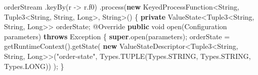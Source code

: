\documentclass[cn,11pt,chinese]{elegantbook}
\newenvironment{Shaded}{}{}
\newcommand{\AttributeTok}[1]{\textcolor[rgb]{0.49,0.56,0.16}{#1}}
\newcommand{\BuiltInTok}[1]{#1}
\newcommand{\DataTypeTok}[1]{\textcolor[rgb]{0.56,0.13,0.00}{#1}}
\newcommand{\FunctionTok}[1]{\textcolor[rgb]{0.02,0.16,0.49}{#1}}
\newcommand{\KeywordTok}[1]{\textcolor[rgb]{0.00,0.44,0.13}{\textbf{#1}}}
\newcommand{\NormalTok}[1]{#1}
\newcommand{\StringTok}[1]{\textcolor[rgb]{0.25,0.44,0.63}{#1}}
\begin{document}
\begin{Shaded}
\begin{Highlighting}[]
\NormalTok{        orderStream}
\NormalTok{            .}\FunctionTok{keyBy}\NormalTok{(r {-}\textgreater{} r.}\FunctionTok{f0}\NormalTok{)}
\NormalTok{            .}\FunctionTok{process}\NormalTok{(}\KeywordTok{new}\NormalTok{ KeyedProcessFunction\textless{}}\BuiltInTok{String}\NormalTok{, Tuple3\textless{}}\BuiltInTok{String}\NormalTok{, }\BuiltInTok{String}\NormalTok{, }\BuiltInTok{Long}\NormalTok{\textgreater{}, }\BuiltInTok{String}\NormalTok{\textgreater{}() \{}
                \KeywordTok{private}\NormalTok{ ValueState\textless{}Tuple3\textless{}}\BuiltInTok{String}\NormalTok{, }\BuiltInTok{String}\NormalTok{, }\BuiltInTok{Long}\NormalTok{\textgreater{}\textgreater{} orderState;}
                \AttributeTok{@Override}
                \KeywordTok{public} \DataTypeTok{void} \FunctionTok{open}\NormalTok{(}\BuiltInTok{Configuration}\NormalTok{ parameters) }\KeywordTok{throws} \BuiltInTok{Exception}\NormalTok{ \{}
                    \KeywordTok{super}\NormalTok{.}\FunctionTok{open}\NormalTok{(parameters);}
\NormalTok{                    orderState = }\FunctionTok{getRuntimeContext}\NormalTok{().}\FunctionTok{getState}\NormalTok{(}
                        \KeywordTok{new}\NormalTok{ ValueStateDescriptor\textless{}Tuple3\textless{}}\BuiltInTok{String}\NormalTok{, }\BuiltInTok{String}\NormalTok{, }\BuiltInTok{Long}\NormalTok{\textgreater{}\textgreater{}(}\StringTok{"order{-}state"}\NormalTok{, }\BuiltInTok{Types}\NormalTok{.}\FunctionTok{TUPLE}\NormalTok{(}\BuiltInTok{Types}\NormalTok{.}\FunctionTok{STRING}\NormalTok{, }\BuiltInTok{Types}\NormalTok{.}\FunctionTok{STRING}\NormalTok{, }\BuiltInTok{Types}\NormalTok{.}\FunctionTok{LONG}\NormalTok{))}
\NormalTok{                    );}
\NormalTok{                \}}


\end{Highlighting}
\end{Shaded}
\end{document}
